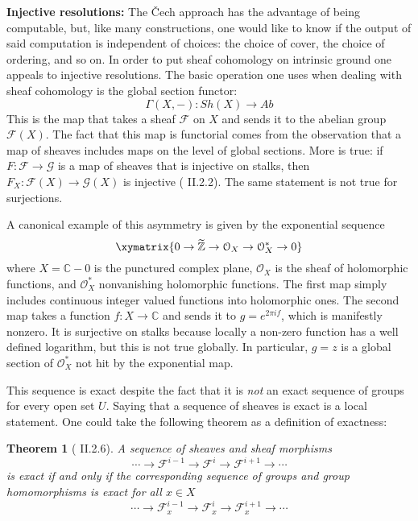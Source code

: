 \documentclass{psapm-l}
\newtheorem{theorem}{Theorem}[section]
\theoremstyle{definition}
\theoremstyle{remark}
\numberwithin{equation}{section}
\begin{document}
\vspace{0.1in}
\noindent
{\bf Injective resolutions:}
The \v Cech approach has the advantage of being computable, but, like many constructions, one would like to know if the output of said computation is independent of choices: the choice of cover, the choice of ordering, and so on. In order to put sheaf cohomology on intrinsic ground one appeals to injective resolutions. The basic operation one uses when dealing with sheaf cohomology is the global section functor:
\[
	\Gamma(X,-):Sh(X)\to Ab
\]
This is the map that takes a sheaf ${{\mathcal F}}$ on $X$ and sends it to the abelian group ${{\mathcal F}}(X)$. The fact that this map is functorial comes from the observation that a map of sheaves includes maps on the level of global sections. More is true: if $F\colon{{\mathcal F}}\to\mathcal{G}$ is a map of sheaves that is injective on stalks, then $F_X\colon{{\mathcal F}}(X)\to\mathcal{G}(X)$ is injective (\cite{Iversen} II.2.2). The same statement is not true for surjections.

A canonical example of this asymmetry is given by the exponential sequence
\[
	\xymatrix{0\to \widetilde{{\mathbb Z}} \to \mathcal{O}_X \to \mathcal{O}^*_X \to 0}
\]
where $X=\mathbb{C}-{0}$ is the punctured complex plane, $\mathcal{O}_X$ is the sheaf of holomorphic functions, and $\mathcal{O}^*_X$ nonvanishing holomorphic functions. The first map simply includes continuous integer valued functions into holomorphic ones. The second map takes a function $f\colon X\to \mathbb{C}$ and sends it to $g=e^{2\pi i f}$, which is manifestly nonzero. It is surjective on stalks because locally a non-zero function has a well defined logarithm, but this is not true globally. In particular, $g=z$ is a global section of $\mathcal{O}^*_X$ not hit by the exponential map.

This sequence is exact despite the fact that it is {\em not} an exact sequence of groups for every open set $U$. Saying that a sequence of sheaves is exact is a local statement. One could take the following theorem as a definition of exactness:

\begin{theorem}[\cite{Iversen} II.2.6]
A sequence of sheaves and sheaf morphisms
	\[
	    \cdots
	    \stackrel{}{\longrightarrow}{{\mathcal F}}^{i-1}
	    \stackrel{}{\longrightarrow}{{\mathcal F}}^i
	    \stackrel{}{\longrightarrow}{{\mathcal F}}^{i+1}
	    \stackrel{}{\longrightarrow}\cdots
	\]
is exact if and only if the corresponding sequence of groups and group homomorphisms is exact for all $x\in X$
	\[
	    \cdots
	    \stackrel{}{\longrightarrow}{{\mathcal F}}^{i-1}_x
	    \stackrel{}{\longrightarrow}{{\mathcal F}}^i_x
	    \stackrel{}{\longrightarrow}{{\mathcal F}}^{i+1}_x
	    \stackrel{}{\longrightarrow}\cdots
	\]
\end{theorem}
\end{document}
